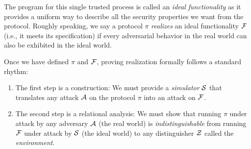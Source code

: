 The program for this single trusted process is called an \emph{ideal
  functionality} as it provides a uniform way to describe all the security
properties we want from the protocol. Roughly speaking, we say a protocol
$\pi$ \emph{realizes} an ideal functionality $\mathcal{{F}}$ (i.e., it meets its
specification) if every adversarial behavior in the real world can also be
exhibited in the ideal world.

Once we have defined $\pi$ and $\mathcal{{F}}$, proving realization formally
follows a standard rhythm:
\begin{enumerate}[leftmargin=*]
\item The first step is a construction: We must provide a \emph{simulator}
  $\mathcal{{S}}$ that translates any attack $\mathcal{{A}}$ on the protocol $\pi$ into
  an attack on $\mathcal{{F}}$.
\item The second step is a relational analysis: We must show that running $\pi$
  under attack by any adversary $\mathcal{{A}}$ (the real world) is
  \emph{indistinguishable} from running $\mathcal{{F}}$ under attack by $\mathcal{{S}}$ (the
  ideal world) to any distinguisher $\mathcal{{Z}}$ called the \emph{environment}.
\end{enumerate}

\begin{comment}
\begin{figure}
  \centering
  \texttt{[image: graphics/suc-experiment]}
  \caption{UC experiment with real world (left) and ideal world (right).}
  \label{fig:uc-experiment}
\end{figure}
All of this is quite abstract so far, so it helps to visualize what the UC
indistinguishability experiment looks like. Figure~\ref{fig:uc-experiment}
illustrates the UC experiment with the real world on the left, the ideal world
on the right, and with communication channels as connecting lines. There are
several things worth noting here:

\begin{itemize}[leftmargin=*]
\item For simplicity, protocols have two parties: $A$ and $B$ in the real world,
  and $A_{\mathbbm{1}}$ and $B_{\mathbbm{1}}$ in the ideal world.
\item In the real world, parties $A$ and $B$ execute the protocol between
  each other, with all messages flowing through the adversary.
\item In the ideal world, parties $A_{\mathbbm{1}}$ and $B_{\mathbbm{1}}$ are
  ``dummy'' parties, which simply relay messages between the environment
  $\mc{Z}$ and the ideal functionality $\mc{F}$.
\item An environment $\mc{Z}$ can interact with each of the worlds in the same
  way, but the main underlying difference is that it is (indirectly) interacting
  with the ideal functionality in the ideal world. If it is the case that the
  real world protocol emulates $\mc{F}$, then no environment should be able to
  tell the two worlds apart.
\end{itemize}
\end{comment}


